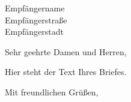 \documentclass{letter}
\begin{document}
\begin{letter}{Empfängername \\ Empfängerstraße \\ Empfängerstadt}
\opening{Sehr geehrte Damen und Herren,}

Hier steht der Text Ihres Briefes.

\closing{Mit freundlichen Grüßen,}

\end{letter}
\end{document}
